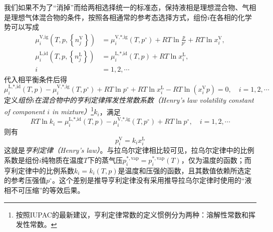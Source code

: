 \documentclass[main.tex]{subfiles}
\begin{document}
我们如果不为了“消掉”而给两相选择统一的标准态，保持液相是理想混合物、气相是理想气体混合物的条件，按照各相通常的参考态选择方式，组份$i$在各相的化学势可以写成
\begin{align*}
  \mu_i^\text{V,ig}\left(T,p,\left\{n_j^\text{V}\right\}\right) & =\mu_i^\text{V,*,ig}\left(T,p^\circ\right)+RT\ln\frac{p}{p^\circ}+RT\ln x_i^\text{V}, \\
  \mu_i^\text{L,id}\left(T,p,\left\{n_j^\text{L}\right\}\right) & =\mu_i^\text{L,*,id}\left(T,p\right)+RT\ln x_i^\text{L},                              \\
  i                                                             & =1,2,\cdots
\end{align*}
代入相平衡条件后得
\[
  \mu_i^\text{L,*,id}\left(T,p\right)-\mu_i^\text{V,*,ig}\left(T,p^\circ\right)+RT\ln p^\circ+RT\ln x_i^\text{L}-RT\ln\left(x_i^\text{V}p\right)=0,\quad i=1,2,\cdots
\]
定义\emph{组份$i$在混合物中的亨利定律挥发性常数系数（Henry's law volatility constant of component $i$ in mixture）}\footnote{按照IUPAC的最新建议\cite{Sander2022}，亨利定律常数的定义惯例分为两种：溶解性常数和挥发性常数。}$k_i$，满足
\[RT\ln k_i=\mu_i^\text{L,*,id}\left(T,p\right)-\mu_i^\text{V,*,ig}\left(T,p^\circ\right)+RT\ln p^\circ,\quad i=1,2,\cdots\]
则有
\[p_i^\text{V}=k_ix_i^\text{L}\]
这就是\emph{亨利定律（Henry's law）}。与拉乌尔定律相比较可见，拉乌尔定律中的比例系数是组份$i$纯物质在温度$T$下的蒸气压$p_i^{*,\text{vap}}=p_i^{*,\text{vap}}\left(T\right)$，仅为温度的函数；而亨利定律中的比例系数$k_i=k_i\left(T,p\right)$是温度和压强的函数，且其数值依赖所选定的参考压强值$p^\circ$。这个差别是推导亨利定律没有采用推导拉乌尔定律时使用的“液相不可压缩”的等效后果。
\end{document}
